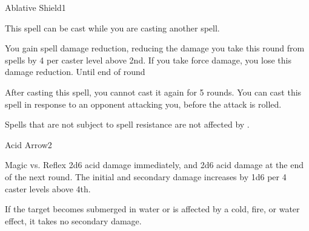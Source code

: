 \begin{spellsection}{Ablative Shield}{1}

\begin{spellheader}
\end{spellheader}
\begin{spellcontent}
    \begin{spelltargetinginfo}
        \spellspecial This spell can be cast while you are casting another spell.
    \end{spelltargetinginfo}
    \begin{spelleffects}
        \spelleffect You gain spell damage reduction, reducing the damage you take this round from spells by 4  per caster level above 2nd. If you take force damage, you lose this damage reduction.
        \spelldur Until end of round
    \end{spelleffects}
\end{spellcontent}
\begin{spellfooter}
    \spellnotes After casting this spell, you cannot cast it again for 5 rounds. You can cast this spell in response to an opponent attacking you, before the attack is rolled.

    Spells that are not subject to spell resistance are not affected by .
\end{spellfooter}
\end{spellsection}

\begin{spellsection}{Acid Arrow}{2}
\begin{spellheader}
\end{spellheader}
\begin{spellcontent}
    \begin{spelltargetinginfo}
    \end{spelltargetinginfo}
    \begin{spelleffects}
        \begin{spellattack}{Magic vs. Reflex}
            \spellsuccess 2d6 acid damage immediately, and 2d6 acid damage at the end of the next round. The initial and secondary damage increases by 1d6 per 4 caster levels above 4th.
        \end{spellattack}
    \end{spelleffects}
\end{spellcontent}
\begin{spellfooter}
    \spellnotes If the target becomes submerged in water or is affected by a cold, fire, or water effect, it takes no secondary damage.

    \physicalspellnotes
\end{spellfooter}
\end{spellsection}

